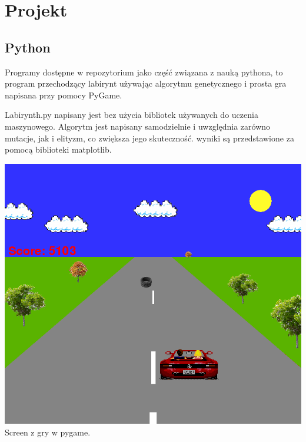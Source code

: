\documentclass{article}
\begin{document}
\newpage

\section{Projekt}

\subsection{Python}
\par Programy dostępne w repozytorium jako część związana z nauką pythona, to program przechodzący labirynt używając algorytmu genetycznego i prosta gra napisana przy pomocy PyGame.\par Labirynth.py napisany jest bez użycia bibliotek używanych do uczenia maszynowego. Algorytm jest napisany samodzielnie i uwzględnia zarówno mutacje, jak i elityzm, co zwiększa jego skuteczność. wyniki są przedstawione za pomocą biblioteki matplotlib.
\begin{center}
\includegraphics[scale=0.35]{pygame.png}\\
Screen z gry w pygame.
\end{center}
\end{document}
